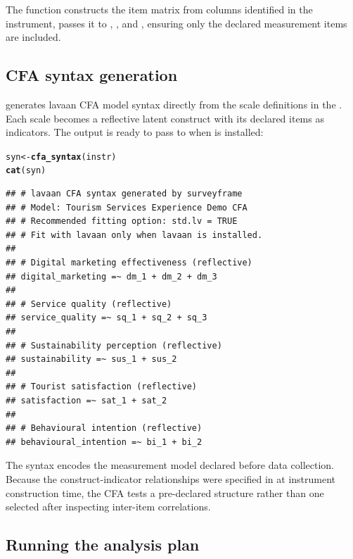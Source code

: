 \documentclass[article]{jss}\usepackage[]{graphicx}\usepackage[]{xcolor}
\makeatletter
\newcommand{\hldef}[1]{\textcolor[rgb]{0.345,0.345,0.345}{#1}}%
\newcommand{\hlkwb}[1]{\textcolor[rgb]{0.69,0.353,0.396}{#1}}%
\newcommand{\hlkwd}[1]{\textcolor[rgb]{0.737,0.353,0.396}{\textbf{#1}}}%
\newenvironment{kframe}{%
 \def\at@end@of@kframe{}%
 \ifinner\ifhmode%
  \def\at@end@of@kframe{\end{minipage}}%
  \begin{minipage}{\columnwidth}%
 \fi\fi%
 \def\FrameCommand##1{\hskip\@totalleftmargin \hskip-\fboxsep
 \colorbox{shadecolor}{##1}\hskip-\fboxsep
     \hskip-\linewidth \hskip-\@totalleftmargin \hskip\columnwidth}%
 \MakeFramed {\advance\hsize-\width
   \@totalleftmargin\z@ \linewidth\hsize
   \@setminipage}}%
 {\par\unskip\endMakeFramed%
 \at@end@of@kframe}
\newenvironment{knitrout}{}{} %
\makeatother
\begin{document}
The function constructs the item matrix from columns identified in the
instrument, passes it to ,
, and ,
ensuring only the declared measurement items are included.

\subsection{CFA syntax generation}

 generates lavaan \citep{rosseel2012} CFA model
syntax directly from the scale definitions in the . Each
scale becomes a reflective latent construct with its declared items as
indicators. The output is ready to pass to  when
 is installed:

\begin{knitrout}
\color{fgcolor}\begin{kframe}
\begin{alltt}
\hldef{syn} \hlkwb{<-} \hlkwd{cfa_syntax}\hldef{(instr)}
\hlkwd{cat}\hldef{(syn)}
\end{alltt}
\begin{verbatim}
## # lavaan CFA syntax generated by surveyframe
## # Model: Tourism Services Experience Demo CFA
## # Recommended fitting option: std.lv = TRUE
## # Fit with lavaan only when lavaan is installed.
## 
## # Digital marketing effectiveness (reflective)
## digital_marketing =~ dm_1 + dm_2 + dm_3
## 
## # Service quality (reflective)
## service_quality =~ sq_1 + sq_2 + sq_3
## 
## # Sustainability perception (reflective)
## sustainability =~ sus_1 + sus_2
## 
## # Tourist satisfaction (reflective)
## satisfaction =~ sat_1 + sat_2
## 
## # Behavioural intention (reflective)
## behavioural_intention =~ bi_1 + bi_2
\end{verbatim}
\end{kframe}
\end{knitrout}

The syntax encodes the measurement model declared before data
collection. Because the construct-indicator relationships were
specified in  at instrument construction time, the
CFA tests a pre-declared structure rather than one selected after
inspecting inter-item correlations.

\subsection{Running the analysis plan}
\end{document}
